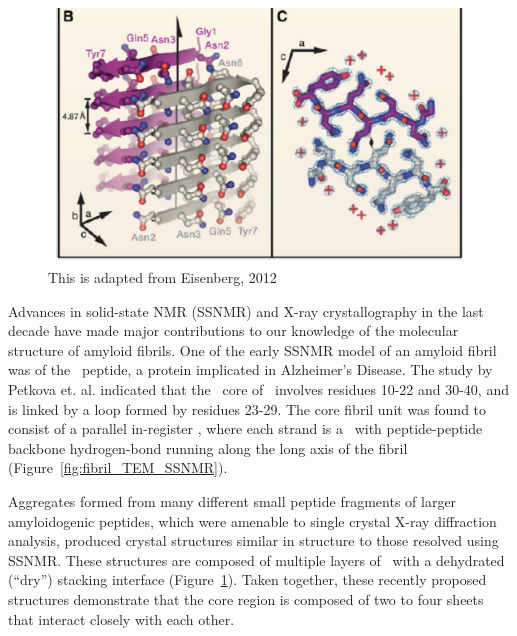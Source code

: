 \begin{figure}
  \centering
  \includegraphics[width=6in]{figures/introduction/fibril_xray_model.pdf}
  \caption[Characteristic cross-$\beta$ spacings from X-ray fibre diffraction studies of amyloid fibrils]{This is adapted from Eisenberg, 2012}
  \label{fig:fibril_xray_model}
\end{figure}


Advances in solid-state NMR (SSNMR) and X-ray crystallography in the last decade have made major contributions to our knowledge of the molecular structure of amyloid fibrils. One of the early SSNMR model of an amyloid fibril was of the \ peptide, a protein implicated in Alzheimer's Disease. The study by Petkova et. al.\cite{Petkova:2006gx} indicated that the \bsheet\ core of \ involves residues 10-22 and 30-40, and is linked by a loop formed by residues 23-29. The core fibril unit was found to consist of a parallel in-register \bsheet, where each strand is a \bhairpin\ with peptide-peptide backbone hydrogen-bond running along the long axis of the fibril (Figure~\ref{fig:fibril_TEM_SSNMR}).

Aggregates formed from many different small peptide fragments of larger amyloidogenic peptides, which were amenable to single crystal X-ray diffraction analysis, produced crystal structures similar in structure to those resolved using SSNMR. These structures are composed of multiple layers of \bsheet\ with a dehydrated (``dry'') stacking interface (Figure~\ref{fig:fibril_xray_model}). Taken together, these recently proposed structures demonstrate that the core region is composed of two to four sheets that interact closely with each other. %

